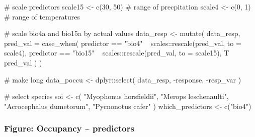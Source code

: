 \documentclass[
]{article}
\newenvironment{Shaded}{}{}
\newcommand{\CommentTok}[1]{\textcolor[rgb]{0.00,0.50,0.00}{#1}}
\newcommand{\DataTypeTok}[1]{#1}
\newcommand{\DecValTok}[1]{#1}
\newcommand{\KeywordTok}[1]{\textcolor[rgb]{0.00,0.00,1.00}{#1}}
\newcommand{\NormalTok}[1]{#1}
\newcommand{\OperatorTok}[1]{#1}
\newcommand{\StringTok}[1]{\textcolor[rgb]{0.00,0.50,0.50}{#1}}
\begin{document}
\begin{Shaded}
\begin{Highlighting}[]
\CommentTok{# scale predictors}
\NormalTok{scale15 <-}\StringTok{ }\KeywordTok{c}\NormalTok{(}\DecValTok{30}\NormalTok{, }\DecValTok{50}\NormalTok{) }\CommentTok{# range of precpitation}
\NormalTok{scale4 <-}\StringTok{ }\KeywordTok{c}\NormalTok{(}\DecValTok{0}\NormalTok{, }\DecValTok{1}\NormalTok{) }\CommentTok{# range of temperatures}

\CommentTok{# scale bio4a and bio15a by actual values}
\NormalTok{data_resp <-}\StringTok{ }\KeywordTok{mutate}\NormalTok{(}
\NormalTok{  data_resp,}
  \DataTypeTok{pred_val =} \KeywordTok{case_when}\NormalTok{(}
\NormalTok{    predictor }\OperatorTok{==}\StringTok{ "bio4"} \OperatorTok{~}\StringTok{ }\NormalTok{scales}\OperatorTok{::}\KeywordTok{rescale}\NormalTok{(pred_val, }\DataTypeTok{to =}\NormalTok{ scale4),}
\NormalTok{    predictor }\OperatorTok{==}\StringTok{ "bio15"} \OperatorTok{~}\StringTok{ }\NormalTok{scales}\OperatorTok{::}\KeywordTok{rescale}\NormalTok{(pred_val, }\DataTypeTok{to =}\NormalTok{ scale15),}
\NormalTok{    T }\OperatorTok{~}\StringTok{ }\NormalTok{pred_val}
\NormalTok{  )}
\NormalTok{)}

\CommentTok{# make long}
\NormalTok{data_poccu <-}\StringTok{ }\NormalTok{dplyr}\OperatorTok{::}\KeywordTok{select}\NormalTok{(}
\NormalTok{  data_resp,}
  \OperatorTok{-}\NormalTok{response, }\OperatorTok{-}\NormalTok{resp_var}
\NormalTok{)}
\end{Highlighting}
\end{Shaded}

\begin{Shaded}
\begin{Highlighting}[]
\CommentTok{# select species}
\NormalTok{soi <-}\StringTok{ }\KeywordTok{c}\NormalTok{(}
  \StringTok{"Myophonus horsfieldii"}\NormalTok{, }\StringTok{"Merops leschenaulti"}\NormalTok{,}
  \StringTok{"Acrocephalus dumetorum"}\NormalTok{, }\StringTok{"Pycnonotus cafer"}
\NormalTok{)}
\NormalTok{which_predictors <-}\StringTok{ }\KeywordTok{c}\NormalTok{(}\StringTok{"bio4"}\NormalTok{)}
\end{Highlighting}
\end{Shaded}

\hypertarget{figure-occupancy-predictors}{%
\subsubsection{Figure: Occupancy \textasciitilde{} predictors}\label{figure-occupancy-predictors}}
\end{document}
